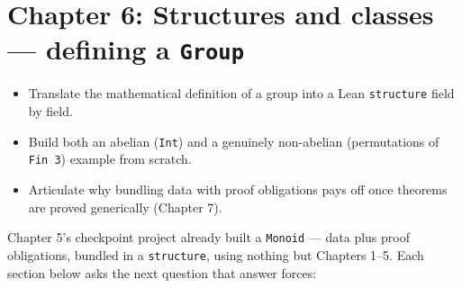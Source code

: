 \chapter{\texorpdfstring{Chapter 6: Structures and classes --- defining a \texttt{Group}}{Chapter 6: Structures and classes --- defining a Group}}\label{sec:06-groups:00-index:1}

\begin{learningobjectives}
\begin{itemize}
\tightlist
\item
  Translate the mathematical definition of a group into a Lean \texttt{structure} field by field.
\item
  Build both an abelian (\texttt{Int}) and a genuinely non-abelian (permutations of \texttt{Fin 3}) example from scratch.
\item
  Articulate why bundling data with proof obligations pays off once theorems are proved generically (Chapter 7).
\end{itemize}
\end{learningobjectives}


Chapter 5's checkpoint project already built a \texttt{Monoid} --- data plus proof obligations, bundled in a \texttt{structure}, using nothing but Chapters 1--5. Each section below asks the next question that answer forces:

